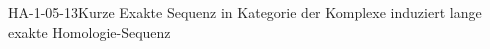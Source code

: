 
\begin{THEO}{HA-1-05-13}{Kurze Exakte Sequenz in Kategorie der Komplexe induziert lange exakte Homologie-Sequenz}
\end{THEO}
